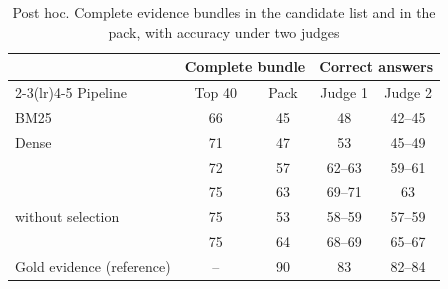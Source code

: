 \begin{table}[tp]
\caption{Post hoc. Complete evidence bundles in the candidate list and in the pack, with accuracy under two judges}
\label{tab:funnel}
\centering
\footnotesize
\setlength{\tabcolsep}{4pt}
\begin{tabular}{@{}lcccc@{}}
\toprule
 & \multicolumn{2}{c}{Complete bundle} & \multicolumn{2}{c}{Correct answers} \\
\cmidrule(lr){2-3}\cmidrule(lr){4-5}
Pipeline & Top 40 & Pack & Judge 1 & Judge 2 \\
\midrule
BM25 & 66 & 45 & 48 & 42--45 \\
Dense & 71 & 47 & 53 & 45--49 \\
\hybrid{} & 72 & 57 & 62--63 & 59--61 \\
\hr{} & 75 & 63 & 69--71 & 63 \\
\lexb{} without selection & 75 & 53 & 58--59 & 57--59 \\
\lexb{} & 75 & 64 & 68--69 & 65--67 \\
Gold evidence (reference) & -- & 90 & 83 & 82--84 \\
\bottomrule
\end{tabular}
\end{table}
